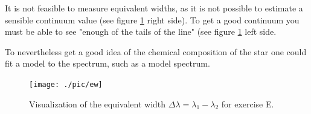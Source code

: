\documentclass[11pt,a4paper,twoside]{article}
\begin{document}
It is not feasible to measure equivalent widths, as it is not possible to 
estimate a sensible continuum value (see figure \ref{fig:ew} right side). To
get a good continuum you must be able to see "enough of the tails of the 
line" (see figure \ref{fig:ew} left side.

To nevertheless get a good idea of the chemical composition of the star one 
could fit a model to the spectrum, such as a model spectrum.

\begin{figure}
\centering
\texttt{[image: ./pic/ew]}
\caption{Visualization of the equivalent width $\Delta\lambda = 
\lambda_1 - \lambda_2$ for exercise E.}
\label{fig:ew}
\end{figure}
\end{document}
